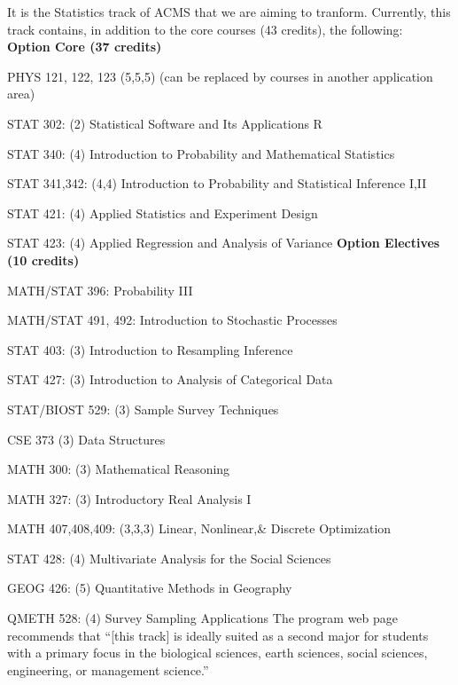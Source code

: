 It is the Statistics track of ACMS that we are aiming to
tranform. Currently, this track contains, in addition to the core
courses (43 credits), the following:
\\
{\bf Option Core (37 credits)}
\bits
    \item PHYS 121, 122, 123 (5,5,5) (can be replaced by courses in another application area)
    \item STAT 302: (2) Statistical Software and Its Applications R
    \item STAT 340: (4) Introduction to Probability and Mathematical Statistics
    \item STAT 341,342: (4,4) Introduction to Probability and Statistical Inference I,II
    \item STAT 421: (4) Applied Statistics and Experiment Design
    \item STAT 423: (4) Applied Regression and Analysis of Variance
\eits
{\bf Option Electives (10 credits)}
\bits
    \item MATH/STAT 396: Probability III
    \item MATH/STAT 491, 492: Introduction to Stochastic Processes
\item[]
    \item STAT 403: (3) Introduction to Resampling Inference
    \item STAT 427: (3) Introduction to Analysis of Categorical Data
    \item STAT/BIOST 529: (3) Sample Survey Techniques
\item[]
    \item CSE 373 (3) Data Structures
\item[]
    \item MATH 300: (3) Mathematical Reasoning
    \item MATH 327: (3) Introductory Real Analysis I
    \item MATH 407,408,409: (3,3,3) Linear, Nonlinear,\& Discrete Optimization
\item[]
    \item STAT 428: (4) Multivariate Analysis for the Social Sciences
    \item GEOG 426: (5) Quantitative Methods in Geography
    \item QMETH 528: (4) Survey Sampling Applications
\eits
The program web page recommends that ``[this track] is ideally suited as a second major for students with a primary focus in the biological sciences, earth sciences, social sciences, engineering, or management science.''


